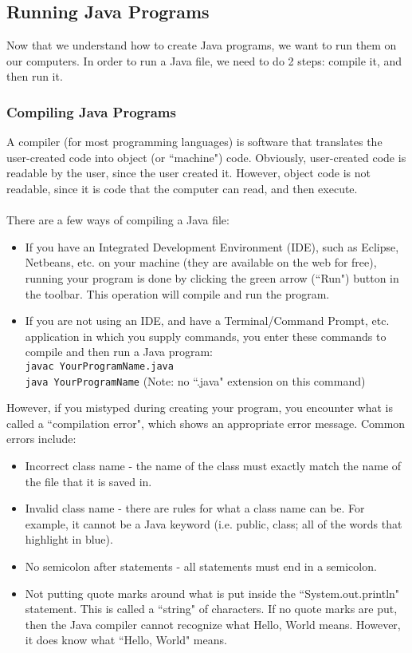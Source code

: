 \subsection{Running Java Programs}
Now that we understand how to create Java programs, we want to run them on our computers. In order to run a Java file, we need to do 2 steps: compile it, and then run it.

\subsubsection{Compiling Java Programs}
A compiler (for most programming languages) is software that translates the user-created code into object (or ``machine") code. Obviously, user-created code is readable by the user, since the user created it. However, object code is not readable, since it is code that the computer can read, and then execute.
\\ \\
There are a few ways of compiling a Java file:
\begin{itemize}
\item If you have an Integrated Development Environment (IDE), such as Eclipse, Netbeans, etc. on your machine (they are available on the web for free), running your program is done by clicking the green arrow (``Run") button in the toolbar. This operation will compile and run the program.

\item If you are not using an IDE, and have a Terminal/Command Prompt, etc. application in which you supply commands, you enter these commands to compile and then run a Java program:
\\
\verb|javac YourProgramName.java| \\
\verb|java YourProgramName| (Note: no ``.java" extension on this command)

\end{itemize}
However, if you mistyped during creating your program, you encounter what is called a ``compilation error", which shows an appropriate error message. Common errors include:

\begin{itemize}
\item Incorrect class name - the name of the class must exactly match the name of the file that it is saved in. 
\item Invalid class name - there are rules for what a class name can be. For example, it cannot be a Java keyword (i.e. public, class; all of the words that highlight in blue).
\item No semicolon after statements - all statements must end in a semicolon.
\item Not putting quote marks around what is put inside the ``System.out.println" statement. This is called a ``string" of characters. If no quote marks are put, then the Java compiler cannot recognize what Hello, World means. However, it does know what ``Hello, World" means.  
\end{itemize}

